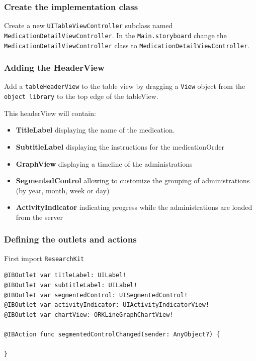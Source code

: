 \documentclass{article}
\begin{document}
\subsubsection{Create the implementation class}\label{create-the-implementation-class}

Create a new \texttt{UITableViewController} subclass named
\texttt{MedicationDetailViewController}. In the \texttt{Main.storyboard}
change the \texttt{MedicationDetailViewController} class to
\texttt{MedicationDetailViewController}.

\subsubsection{Adding the HeaderView}\label{adding-the-headerview}

Add a \texttt{tableHeaderView} to the table view by dragging a
\texttt{View} object from the \texttt{object\ library} to the top edge
of the tableView.

This headerView will contain:
\begin{itemize}
\item
  \textbf{TitleLabel} displaying the name of the medication.
\item
  \textbf{SubtitleLabel} displaying the instructions for the medicationOrder
\item
  \textbf{GraphView} displaying a timeline of the administrations
\item
  \textbf{SegmentedControl} allowing to customize the grouping of administrations (by year, month, week or day)
\item
\textbf{ActivityIndicator} indicating progress while the administrations are loaded from the server
\end{itemize}


\subsubsection{Defining the outlets and actions}\label{step7:defining-the-outlets-and-actions}
First import \texttt{ResearchKit}

\begin{verbatim}
@IBOutlet var titleLabel: UILabel!
@IBOutlet var subtitleLabel: UILabel!
@IBOutlet var segmentedControl: UISegmentedControl!
@IBOutlet var activityIndicator: UIActivityIndicatorView!
@IBOutlet var chartView: ORKLineGraphChartView!

@IBAction func segmentedControlChanged(sender: AnyObject?) {

}
\end{verbatim}
\end{document}
